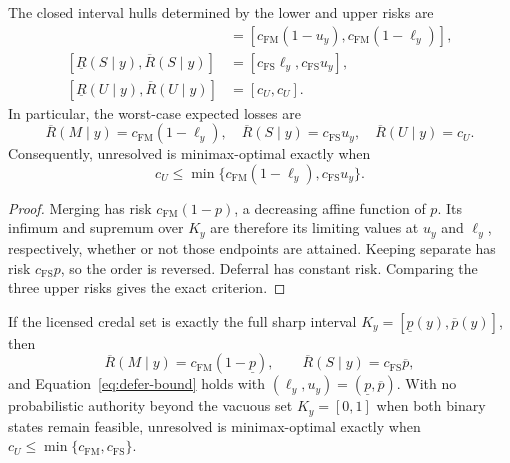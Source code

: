 \begin{proposition}
\label{prop:binary-bound}
The closed interval hulls determined by the lower and upper risks are
\begin{align}
 [\underline R(M\mid y),\overline R(M\mid y)]
   &=[c_{\mathrm{FM}}(1-u_y),c_{\mathrm{FM}}(1-\ell_y)],\\
 [\underline R(S\mid y),\overline R(S\mid y)]
   &=[c_{\mathrm{FS}}\ell_y,c_{\mathrm{FS}}u_y],\\
 [\underline R(U\mid y),\overline R(U\mid y)]
   &=[c_U,c_U].
 \label{eq:binary-risk-envelope}
\end{align}
In particular, the worst-case expected losses are
\begin{equation}
 \overline R(M\mid y)=c_{\mathrm{FM}}(1-\ell_y),\quad
 \overline R(S\mid y)=c_{\mathrm{FS}}u_y,\quad
 \overline R(U\mid y)=c_U.
 \label{eq:binary-risk}
\end{equation}
Consequently, unresolved is minimax-optimal exactly when
\begin{equation}
 c_U\leq
 \min\{c_{\mathrm{FM}}(1-\ell_y),c_{\mathrm{FS}}u_y\}.
 \label{eq:defer-bound}
\end{equation}
\end{proposition}

\begin{proof}
Merging has risk $c_{\mathrm{FM}}(1-p)$, a decreasing affine function of $p$.
Its infimum and supremum over $K_y$ are therefore its limiting values at $u_y$
and $\ell_y$, respectively, whether or not those endpoints are attained.
Keeping separate has risk $c_{\mathrm{FS}}p$, so the order is reversed.
Deferral has constant risk. Comparing the three upper risks gives the exact
criterion.
\end{proof}

\begin{corollary}
If the licensed credal set is exactly the full sharp interval
$K_y=[\underline p(y),\overline p(y)]$, then
\begin{equation}
 \overline R(M\mid y)=c_{\mathrm{FM}}(1-\underline p),\qquad
 \overline R(S\mid y)=c_{\mathrm{FS}}\overline p,
\end{equation}
and Equation~\eqref{eq:defer-bound} holds with
$(\ell_y,u_y)=(\underline p,\overline p)$. With no probabilistic authority
beyond the vacuous set $K_y=[0,1]$ when both binary states remain feasible,
unresolved is minimax-optimal exactly when
$c_U\leq\min\{c_{\mathrm{FM}},c_{\mathrm{FS}}\}$.
\end{corollary}

